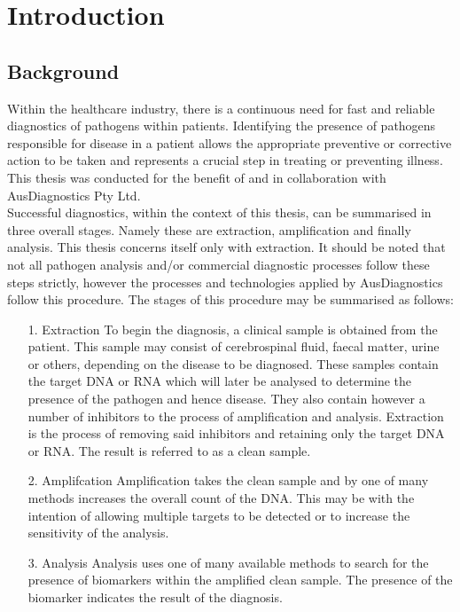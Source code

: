 \chapter{Introduction}
\label{cha:introduction}

\section{Background}
\label{sec:intro_background}

Within the healthcare industry, there is a continuous need for fast and reliable diagnostics of pathogens within patients. Identifying the presence of pathogens responsible for disease in a patient allows the appropriate preventive or corrective action to be taken and represents a crucial step in treating or preventing illness. This thesis was conducted for the benefit of and in collaboration with AusDiagnostics Pty Ltd.\\

Successful diagnostics, within the context of this thesis, can be summarised in three overall stages. Namely these are extraction, amplification and finally analysis. This thesis concerns itself only with extraction. It should be noted that not all pathogen analysis and/or commercial diagnostic processes follow these steps strictly, however the processes and technologies applied by AusDiagnostics follow this procedure. The stages of this procedure may be summarised as follows:
\begin{enumerate}
	\item [1. Extraction] To begin the diagnosis, a clinical sample is obtained from the patient. This sample may consist of cerebrospinal fluid, faecal matter, urine or others, depending on the disease to be diagnosed. These samples contain the target DNA or RNA which will later be analysed to determine the presence of the pathogen and hence disease. They also contain however a number of inhibitors to the process of amplification and analysis. Extraction is the process of removing said inhibitors and retaining only the target DNA or RNA. The result is referred to as a clean sample.
	\item  [2. Amplifcation] Amplification takes the clean sample and by one of many methods increases the overall count of the DNA. This may be with the intention of allowing multiple targets to be detected or to increase the sensitivity of the analysis.
	\item[3. Analysis] Analysis uses one of many available methods to search for the presence of biomarkers within the amplified clean sample. The presence of the biomarker indicates the result of the diagnosis.
\end{enumerate}


